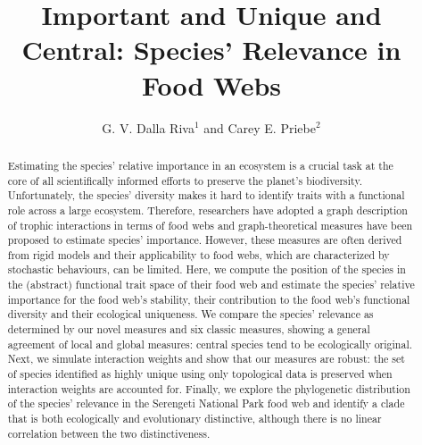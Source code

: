 \documentclass[]{rsos}%
\begin{document}
\title{Important and Unique and Central: Species' Relevance in Food Webs}

\author{%
G. V. Dalla Riva$^{1}$ and Carey E. Priebe$^{2}$}

\address{$^{1}$Biomathematics Research Centre\\ School of Mathematics and Statistics\\ University of Canterbury\\ Christchurch, New Zealand\\
$^{2}$Department of Applied Mathematics and Statistics\\ Whiting School of Engineering\\ Johns Hopkins University\\ Baltimore, MD}

\subject{Ecology, Evolution, Mathematical Modelling}



\begin{abstract}
Estimating the species' relative importance in an ecosystem  is a crucial task at the
core of all scientifically informed efforts to preserve the planet's biodiversity.
Unfortunately, the species' diversity makes
it hard to identify traits with a functional role across a large ecosystem.
Therefore, researchers have adopted a graph description of trophic interactions
in terms of food webs and graph-theoretical measures have been proposed to
estimate species' importance. However, these measures are often derived from
rigid models and their applicability to food webs, which are characterized by
stochastic behaviours, can be limited. Here, we compute the position of the species
in the (abstract) functional trait space of their food web and estimate the species' relative
importance for the food web's stability, their contribution to the food web's
functional diversity and their ecological uniqueness. We compare
the species' relevance as determined by our novel measures and six classic
measures, showing a general agreement of local and global measures: central species
tend to be ecologically original. Next, we simulate interaction weights and show that our
measures are robust: the set of species identified as highly unique using only topological
data is preserved when interaction weights are accounted for.  Finally, we explore the phylogenetic distribution of
the species' relevance in the Serengeti National Park food web and identify a clade
that is both ecologically and evolutionary distinctive, although there is no linear correlation
between the two distinctiveness.
\end{abstract}
\end{document}
